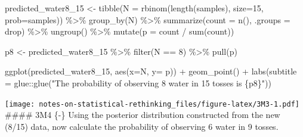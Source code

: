 \documentclass[
]{book}
\newenvironment{Shaded}{\begin{snugshade}}{\end{snugshade}}
\newcommand{\AttributeTok}[1]{\textcolor[rgb]{0.77,0.63,0.00}{#1}}
\newcommand{\DecValTok}[1]{\textcolor[rgb]{0.00,0.00,0.81}{#1}}
\newcommand{\FunctionTok}[1]{\textcolor[rgb]{0.00,0.00,0.00}{#1}}
\newcommand{\NormalTok}[1]{#1}
\newcommand{\OtherTok}[1]{\textcolor[rgb]{0.56,0.35,0.01}{#1}}
\newcommand{\SpecialCharTok}[1]{\textcolor[rgb]{0.00,0.00,0.00}{#1}}
\newcommand{\StringTok}[1]{\textcolor[rgb]{0.31,0.60,0.02}{#1}}
\begin{document}
\begin{Shaded}
\begin{Highlighting}[]
\NormalTok{predicted\_water8\_15 }\OtherTok{\textless{}{-}} 
  \FunctionTok{tibble}\NormalTok{(}\AttributeTok{N =} \FunctionTok{rbinom}\NormalTok{(}\FunctionTok{length}\NormalTok{(samples), }\AttributeTok{size=}\DecValTok{15}\NormalTok{, }\AttributeTok{prob=}\NormalTok{samples)) }\SpecialCharTok{\%\textgreater{}\%}
  \FunctionTok{group\_by}\NormalTok{(N) }\SpecialCharTok{\%\textgreater{}\%}
  \FunctionTok{summarize}\NormalTok{(}\AttributeTok{count =} \FunctionTok{n}\NormalTok{(), }\AttributeTok{.groups =} \StringTok{\textquotesingle{}drop\textquotesingle{}}\NormalTok{)  }\SpecialCharTok{\%\textgreater{}\%}
  \FunctionTok{ungroup}\NormalTok{() }\SpecialCharTok{\%\textgreater{}\%}
  \FunctionTok{mutate}\NormalTok{(}\AttributeTok{p =}\NormalTok{ count }\SpecialCharTok{/} \FunctionTok{sum}\NormalTok{(count))}
  
\NormalTok{p8 }\OtherTok{\textless{}{-}} 
\NormalTok{  predicted\_water8\_15 }\SpecialCharTok{\%\textgreater{}\%}
  \FunctionTok{filter}\NormalTok{(N }\SpecialCharTok{==} \DecValTok{8}\NormalTok{) }\SpecialCharTok{\%\textgreater{}\%}
  \FunctionTok{pull}\NormalTok{(p)}

\FunctionTok{ggplot}\NormalTok{(predicted\_water8\_15, }\FunctionTok{aes}\NormalTok{(}\AttributeTok{x=}\NormalTok{N, }\AttributeTok{y=}\NormalTok{ p)) }\SpecialCharTok{+} 
    \FunctionTok{geom\_point}\NormalTok{() }\SpecialCharTok{+} 
  \FunctionTok{labs}\NormalTok{(}\AttributeTok{subtitle =}\NormalTok{ glue}\SpecialCharTok{::}\FunctionTok{glue}\NormalTok{(}\StringTok{"The probability of observing 8 water in 15 tosses is \{p8\}"}\NormalTok{))}
\end{Highlighting}
\end{Shaded}

\texttt{[image: notes-on-statistical-rethinking\_files/figure-latex/3M3-1.pdf]}
\#\#\#\# 3M4 \{-\}
Using the posterior distribution constructed from the new (8/15) data, now calculate the probability of observing 6 water in 9 tosses.
\end{document}
